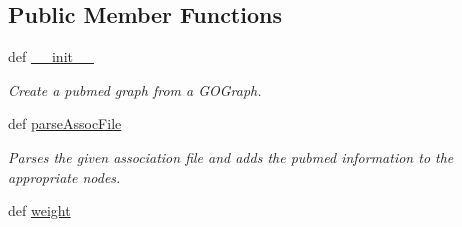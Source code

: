 \subsection*{Public Member Functions}
\begin{DoxyCompactItemize}
\item 
def \hyperlink{classgographer_1_1_g_o_pubmed_graph_1_1_g_o_pubmed_graph_a189fe767deaf77d733fa53e47163d81a}{\-\_\-\-\_\-init\-\_\-\-\_\-}
\begin{DoxyCompactList}\small\item\em Create a pubmed graph from a G\-O\-Graph. \end{DoxyCompactList}\item 
def \hyperlink{classgographer_1_1_g_o_pubmed_graph_1_1_g_o_pubmed_graph_a3a1f46901b29f0aac04b185f620f24a5}{parse\-Assoc\-File}
\begin{DoxyCompactList}\small\item\em Parses the given association file and adds the pubmed information to the appropriate nodes. \end{DoxyCompactList}\item 
\hypertarget{classgographer_1_1_g_o_pubmed_graph_1_1_g_o_pubmed_graph_ad09c08e73d20d8cd50dddd1b8d9c1e19}{def \hyperlink{classgographer_1_1_g_o_pubmed_graph_1_1_g_o_pubmed_graph_ad09c08e73d20d8cd50dddd1b8d9c1e19}{weight}}\label{classgographer_1_1_g_o_pubmed_graph_1_1_g_o_pubmed_graph_ad09c08e73d20d8cd50dddd1b8d9c1e19}


\end{DoxyCompactItemize}
